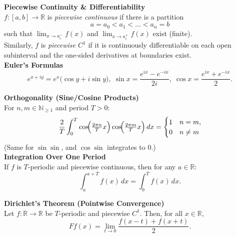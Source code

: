 \documentclass[8pt]{article}
\begin{document}
\let\oldenumerate\enumerate
\def\enumerate{\oldenumerate
	\setlength{\itemsep}{0pt}
	\setlength{\parskip}{0pt}
	\setlength{\parsep}{0pt}
}
\let\olditemize\itemize
\def\itemize{\olditemize
	\setlength{\itemsep}{0pt}
	\setlength{\parskip}{0pt}
	\setlength{\parsep}{0pt}
}
\small
\begin{multicols}{2}

	\noindent \textbf{Piecewise Continuity \& Differentiability}\\
	$f:[a,b]\to\mathbb{R}$ is \emph{piecewise continuous} if there is a partition
	\[
		a=a_0 < a_1 < \dots < a_n = b
	\]
	such that $\lim_{x \to a_i^-} f(x)$ and $\lim_{x \to a_i^+} f(x)$ exist (finite).\\
	Similarly, $f$ is \emph{piecewise $C^1$} if it is continuously differentiable on each open subinterval and the one‐sided derivatives at boundaries exist.\\

	\noindent \textbf{Euler's Formulas}
	\[
		e^{x+iy} = e^{x}\bigl(\cos y + i \sin y\bigr),\;
		\sin x = \frac{e^{ix}-e^{-ix}}{2i},\;
		\cos x = \frac{e^{ix}+e^{-ix}}{2}.
	\]

	\noindent \textbf{Orthogonality (Sine/Cosine Products)}\\
	For $n,m \in \mathbb{N}_{\ge 1}$ and period $T>0$:
	\[
		\frac{2}{T} \int_{0}^{T}
		\cos\!\Bigl(\tfrac{2\pi n}{T}x\Bigr)\cos\!\Bigl(\tfrac{2\pi m}{T}x\Bigr)\,dx
		=
		\begin{cases}
			1 & n=m,    \\
			0 & n\neq m
		\end{cases}
	\]
	(Same for $\sin\sin$, and $\cos\sin$ integrates to $0$.)\\

	\noindent \textbf{Integration Over One Period}\\
	If $f$ is $T$-periodic and piecewise continuous, then for any $a\in\mathbb{R}$:
	\[
		\int_{a}^{a+T} f(x)\,dx = \int_{0}^{T} f(x)\,dx.
	\]

	\noindent \textbf{Dirichlet's Theorem (Pointwise Convergence)}\\
	Let \( f : \mathbb{R} \to \mathbb{R} \) be \( T \)-periodic and piecewise \( C^1 \). Then, for all \( x \in \mathbb{R} \),
	\[
		Ff(x) = \lim_{t \to 0} \frac{f(x - t) + f(x + t)}{2}.
	\]


\end{multicols}
\end{document}
